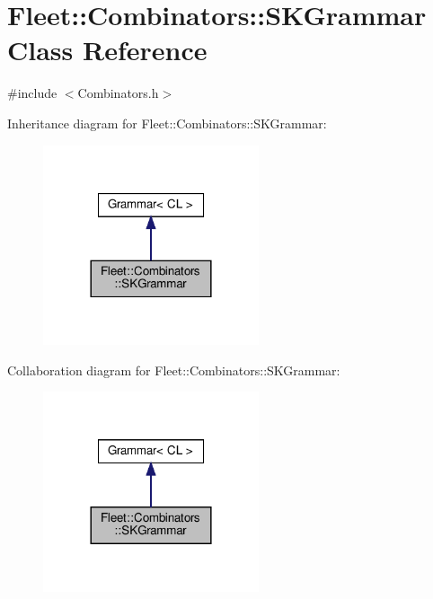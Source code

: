\hypertarget{class_fleet_1_1_combinators_1_1_s_k_grammar}{}\section{Fleet\+:\+:Combinators\+:\+:S\+K\+Grammar Class Reference}
\label{class_fleet_1_1_combinators_1_1_s_k_grammar}


{\ttfamily \#include $<$Combinators.\+h$>$}



Inheritance diagram for Fleet\+:\+:Combinators\+:\+:S\+K\+Grammar\+:\nopagebreak
\begin{figure}[H]
\begin{center}
\leavevmode
\includegraphics[width=180pt]{class_fleet_1_1_combinators_1_1_s_k_grammar__inherit__graph}
\end{center}
\end{figure}


Collaboration diagram for Fleet\+:\+:Combinators\+:\+:S\+K\+Grammar\+:
\nopagebreak
\begin{figure}[H]
\begin{center}
\leavevmode
\includegraphics[width=180pt]{class_fleet_1_1_combinators_1_1_s_k_grammar__coll__graph}
\end{center}
\end{figure}
